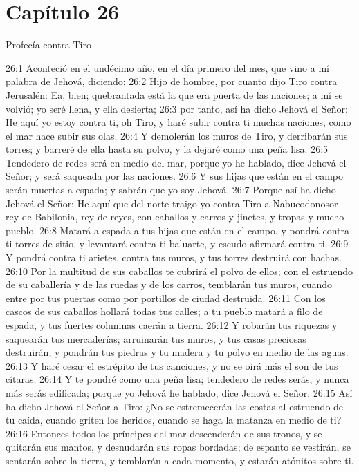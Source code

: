 \section*{Capítulo 26 } 
Profecía contra Tiro   
  
26:1 Aconteció en el undécimo año, en el día primero del mes, que vino a mí palabra de Jehová, diciendo:   
26:2 Hijo de hombre, por cuanto dijo Tiro contra Jerusalén: Ea, bien; quebrantada está la que era puerta de las naciones; a mí se volvió; yo seré llena, y ella desierta;   
26:3 por tanto, así ha dicho Jehová el Señor: He aquí yo estoy contra ti, oh Tiro, y haré subir contra ti muchas naciones, como el mar hace subir sus olas.   
26:4 Y demolerán los muros de Tiro, y derribarán sus torres; y barreré de ella hasta su polvo, y la dejaré como una peña lisa.   
26:5 Tendedero de redes será en medio del mar, porque yo he hablado, dice Jehová el Señor; y será saqueada por las naciones.   
26:6 Y sus hijas que están en el campo serán muertas a espada; y sabrán que yo soy Jehová.   
26:7 Porque así ha dicho Jehová el Señor: He aquí que del norte traigo yo contra Tiro a Nabucodonosor rey de Babilonia, rey de reyes, con caballos y carros y jinetes, y tropas y mucho pueblo.   
26:8 Matará a espada a tus hijas que están en el campo, y pondrá contra ti torres de sitio, y levantará contra ti baluarte, y escudo afirmará contra ti.   
26:9 Y pondrá contra ti arietes, contra tus muros, y tus torres destruirá con hachas.   
26:10 Por la multitud de sus caballos te cubrirá el polvo de ellos; con el estruendo de su caballería y de las ruedas y de los carros, temblarán tus muros, cuando entre por tus puertas como por portillos de ciudad destruida.   
26:11 Con los cascos de sus caballos hollará todas tus calles; a tu pueblo matará a filo de espada, y tus fuertes columnas caerán a tierra.   
26:12 Y robarán tus riquezas y saquearán tus mercaderías; arruinarán tus muros, y tus casas preciosas destruirán; y pondrán tus piedras y tu madera y tu polvo en medio de las aguas.   
26:13 Y haré cesar el estrépito de tus canciones, y no se oirá más el son de tus cítaras. 
26:14 Y te pondré como una peña lisa; tendedero de redes serás, y nunca más serás edificada; porque yo Jehová he hablado, dice Jehová el Señor.   
26:15 Así ha dicho Jehová el Señor a Tiro: ¿No se estremecerán las costas al estruendo de tu caída, cuando griten los heridos, cuando se haga la matanza en medio de ti?   
26:16 Entonces todos los príncipes del mar descenderán de sus tronos, y se quitarán sus mantos, y desnudarán sus ropas bordadas; de espanto se vestirán, se sentarán sobre la tierra, y temblarán a cada momento, y estarán atónitos sobre ti.   
